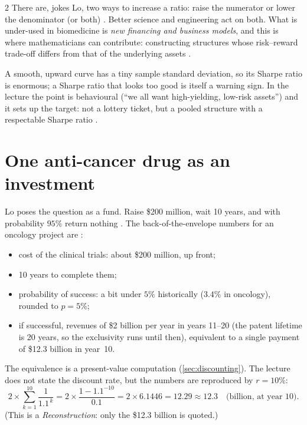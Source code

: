 \begin{paracol}{2}
There are, jokes Lo, two ways to increase a ratio: raise the numerator or lower the denominator
(or both) . Better science and engineering act on both. What is under-used in biomedicine is
\emph{new financing and business models}, and this is where mathematicians can contribute: constructing
structures whose risk--reward trade-off differs from that of the underlying assets
.

\begin{finance}
A smooth, upward curve has a tiny sample standard deviation, so its Sharpe ratio is enormous; a Sharpe ratio
that looks too good is itself a warning sign. In the lecture the point is behavioural (``we all want
high-yielding, low-risk assets'') and it sets up the target: not a lottery ticket, but a pooled structure with a
respectable Sharpe ratio .
\end{finance}

\section{One anti-cancer drug as an investment}\label{ch12:sec-single}

Lo poses the question as a fund. Raise \$200 million, wait 10 years, and with probability $95\%$ return nothing
. The back-of-the-envelope numbers for an oncology project are :
\begin{itemize}
  \item cost of the clinical trials: about \$200 million, up front;
  \item 10 years to complete them;
  \item probability of success: a bit under $5\%$ historically ($3.4\%$ in oncology), rounded to $p=5\%$;
  \item if successful, revenues of \$2 billion per year in years 11--20 (the patent lifetime is 20 years, so the
        exclusivity runs until then), equivalent to a single payment of \$12.3 billion in year~10.
\end{itemize}
The equivalence is a present-value computation (\cref{sec:discounting}). The lecture does not state the discount
rate, but the numbers are reproduced by $r=10\%$:
\begin{equation}\label{ch12:eq-annuity}
  2\times\sum_{k=1}^{10}\frac{1}{1.1^{\,k}}=2\times\frac{1-1.1^{-10}}{0.1}=2\times6.1446=12.29\approx12.3
  \quad\text{(billion, at year 10).}
\end{equation}
(This is a \emph{Reconstruction}: only the \$12.3 billion is quoted.)


\end{paracol}
